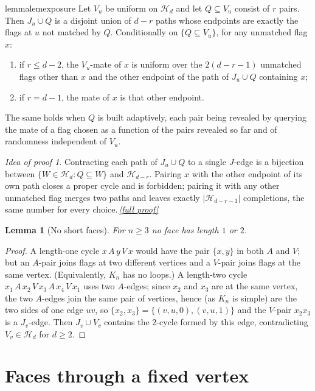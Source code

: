 \documentclass[11pt,a4paper]{article}
\theoremstyle{plain}
\newtheorem{lemma}[theorem]{Lemma}
\theoremstyle{definition}
\theoremstyle{remark}
\newtheorem*{proofidea}{Idea of proof}
\newcommand{\fullproofref}[1]{\,\hyperref[#1]{\textit{[full proof]}}}
\providecommand{\tightlist}{\setlength{\itemsep}{0pt}\setlength{\parskip}{0pt}}
\newcommand{\cH}{\mathcal H}
\begin{document}
\begin{restatable}{lemma}{lemexposure}\label{lem:exposure}
Let $V_u$ be uniform on $\cH_d$ and let $Q\subseteq V_u$ consist of $r$ pairs. Then $J_u\cup Q$ is a disjoint union of $d-r$ paths whose endpoints are exactly the flags at $u$ not matched by $Q$. Conditionally on $\{Q\subseteq V_u\}$, for any unmatched flag $x$:
\begin{enumerate}[label=(\roman*)]\tightlist
\item if $r\le d-2$, the $V_u$-mate of $x$ is uniform over the $2(d-r-1)$ unmatched flags other than $x$ and the other endpoint of the path of $J_u\cup Q$ containing $x$;
\item if $r=d-1$, the mate of $x$ is that other endpoint.
\end{enumerate}
The same holds when $Q$ is built adaptively, each pair being revealed by querying the mate of a flag chosen as a function of the pairs revealed so far and of randomness independent of $V_u$.
\end{restatable}
\begin{proofidea}
Contracting each path of $J_u\cup Q$ to a single $J$-edge is a bijection between $\{W\in\cH_d:Q\subseteq W\}$ and $\cH_{d-r}$. Pairing $x$ with the other endpoint of its own path closes a proper cycle and is forbidden; pairing it with any other unmatched flag merges two paths and leaves exactly $|\cH_{d-r-1}|$ completions, the same number for every choice.\fullproofref{pf:exposure}
\end{proofidea}

\begin{lemma}[No short faces]\label{lem:short}
For $n\ge3$ no face has length $1$ or $2$.
\end{lemma}
\begin{proof}
A length-one cycle $x\,A\,y\,V\,x$ would have the pair $\{x,y\}$ in both $A$ and $V$; but an $A$-pair joins flags at two different vertices and a $V$-pair joins flags at the same vertex. (Equivalently, $K_n$ has no loops.) A length-two cycle $x_1\,A\,x_2\,V\,x_3\,A\,x_4\,V\,x_1$ uses two $A$-edges; since $x_2$ and $x_3$ are at the same vertex, the two $A$-edges join the same pair of vertices, hence (as $K_n$ is simple) are the two sides of one edge $uv$, so $\{x_2,x_3\}=\{(v,u,0),(v,u,1)\}$ and the $V$-pair $x_2x_3$ is a $J_v$-edge. Then $J_v\cup V_v$ contains the $2$-cycle formed by this edge, contradicting $V_v\in\cH_d$ for $d\ge2$.
\end{proof}

\section{Faces through a fixed vertex}\label{sec:hit}
\end{document}
